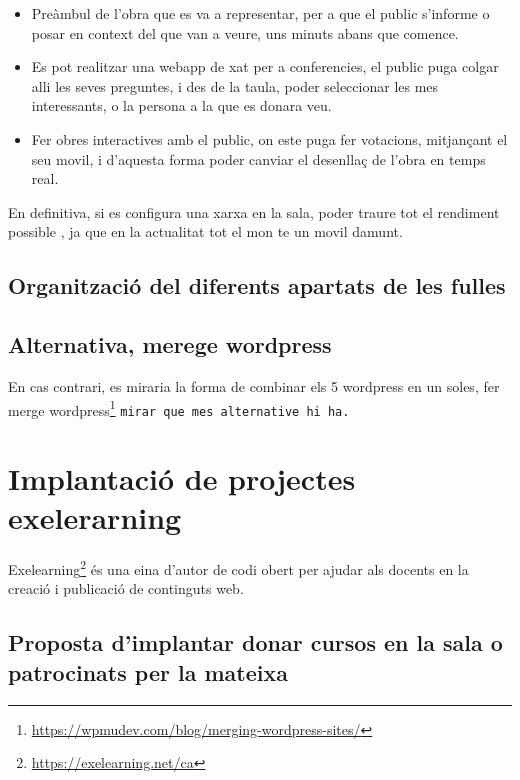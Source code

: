 \documentclass[
  10pt,
]{book}
\DeclareRobustCommand{\href}[2]{#2\footnote{\url{#1}}}
\begin{document}
\begin{itemize}
\item
  Preàmbul de l'obra que es va a representar, per a que el public s'informe o posar en context del que van a veure, uns minuts abans que comence.
\item
  Es pot realitzar una webapp de xat per a conferencies, el public puga colgar alli les seves preguntes, i des de la taula, poder seleccionar les mes interessants, o la persona a la que es donara veu.
\item
  Fer obres interactives amb el public, on este puga fer votacions, mitjançant el seu movil, i d'aquesta forma poder canviar el desenllaç de l'obra en temps real.
\end{itemize}

En definitiva, si es configura una xarxa en la sala, poder traure tot el rendiment possible , ja que en la actualitat tot el mon te un movil damunt.

\hypertarget{organitzaciuxf3-del-diferents-apartats-de-les-fulles}{%
\section{Organització del diferents apartats de les fulles}\label{organitzaciuxf3-del-diferents-apartats-de-les-fulles}}

\hypertarget{alternativa-merege-wordpress}{%
\section{Alternativa, merege wordpress}\label{alternativa-merege-wordpress}}

En cas contrari, es miraria la forma de combinar els 5 wordpress en un soles, fer \href{https://wpmudev.com/blog/merging-wordpress-sites/}{merge wordpress}
\texttt{mirar\ que\ mes\ alternative\ hi\ ha.}

\hypertarget{implantaciuxf3-de-projectes-exelerarning}{%
\chapter{Implantació de projectes exelerarning}\label{implantaciuxf3-de-projectes-exelerarning}}

\href{https://exelearning.net/ca}{Exelearning} és una eina d'autor de codi obert per ajudar als docents en la creació i publicació de continguts web.

\hypertarget{proposta-dimplantar-donar-cursos-en-la-sala-o-patrocinats-per-la-mateixa}{%
\section{Proposta d'implantar donar cursos en la sala o patrocinats per la mateixa}\label{proposta-dimplantar-donar-cursos-en-la-sala-o-patrocinats-per-la-mateixa}}
\end{document}
